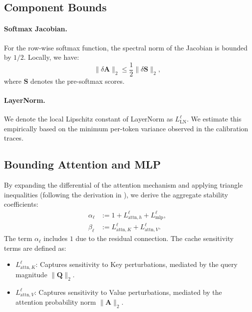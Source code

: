 \documentclass{article}
\theoremstyle{plain}
\theoremstyle{definition}
\theoremstyle{remark}
\begin{document}
\subsection{Component Bounds}
\label{sec:ingredients}

\paragraph{Softmax Jacobian.}
For the row-wise softmax function, the spectral norm of the Jacobian is bounded by $1/2$. Locally, we have:
\begin{equation}
\| \delta \mathbf{A} \|_2 \le \frac{1}{2} \| \delta \mathbf{S} \|_2,
\end{equation}
where $\mathbf{S}$ denotes the pre-softmax scores.

\paragraph{LayerNorm.}
We denote the local Lipschitz constant of LayerNorm as $L_{\mathrm{LN}}^\ell$. We estimate this empirically based on the minimum per-token variance observed in the calibration traces.

\subsection{Bounding Attention and MLP}
\label{sec:attn_bound}

By expanding the differential of the attention mechanism and applying triangle inequalities (following the derivation in \citet{kim2021lipschitz}), we derive the aggregate stability coefficients:
\begin{align}
\alpha_\ell
&:= 1 + L_{\mathrm{attn}, h}^\ell + L_{\mathrm{mlp}}^\ell, \\
\beta_\ell
&:= L_{\mathrm{attn}, K}^\ell + L_{\mathrm{attn}, V}^\ell.
\end{align}
The term $\alpha_\ell$ includes $1$ due to the residual connection.
The cache sensitivity terms are defined as:
\begin{itemize}
    \item $L_{\mathrm{attn}, K}^\ell$: Captures sensitivity to Key perturbations, mediated by the query magnitude $\|\mathbf{Q}\|_2$.
    \item $L_{\mathrm{attn}, V}^\ell$: Captures sensitivity to Value perturbations, mediated by the attention probability norm $\|\mathbf{A}\|_2$.
\end{itemize}
\end{document}

